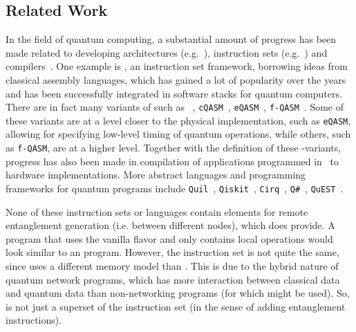 \subsection{Related Work}
\label{sec:related}
In the field of quantum computing, a substantial amount of progress has been made related to developing
architectures (e.g.~\cite{fu2017microarchitecture,bourassa2020photonicblueprint, murali2019fullstack, wecker2014liqui, khammassi2020openql, amy2019staq, green2013quipper, Steiger2016}),
instruction sets (e.g.~\cite{cross2017openqasm,khammassi2018cqasm,fu2019eqasm,liu2017fqasm,smith2016quil,qiskit,cirq,qsharp,jones2019quest}) and
compilers~\cite{zulehner2019compiling, haner2018software, gokhale2020quantum, liu2020new, gokhale2020optimized, ding2020square, smith2020opensource, Sivarajah_2020, hietala2019verified, zhang2020contextmapping, niu2020hardware, dury2020qubo, pozzi2020using, Nishio_2020}.
One example is \qasm, an instruction set framework, borrowing ideas from classical assembly languages, which has gained a lot of popularity over the years and has been successfully integrated in software stacks for quantum computers.
There are in fact many variants of \qasm such as \openqasm~\cite{cross2017openqasm}, \texttt{cQASM}~\cite{khammassi2018cqasm}, \texttt{eQASM}~\cite{fu2019eqasm}, \texttt{f-QASM}~\cite{liu2017fqasm}.
Some of these variants are at a level closer to the physical implementation, such as \texttt{eQASM}, allowing for specifying low-level timing of quantum operations, while others, such as \texttt{f-QASM}, are at a higher level.
Together with the definition of these \qasm-variants, progress has also been made in compilation of applications programmed in \qasm\ to hardware implementations.
More abstract languages and programming frameworks for quantum programs include \texttt{Quil}~\cite{smith2016quil}, \texttt{Qiskit}~\cite{qiskit}, \texttt{Cirq}~\cite{cirq}, \texttt{Q\#}~\cite{qsharp}, \texttt{QuEST}~\cite{jones2019quest}.

None of these instruction sets or languages contain elements for remote entanglement generation (i.e. between different nodes), which \netqasm does provide.
A \netqasm program that uses the vanilla flavor and only contains local operations would look similar to an \openqasm program.
However, the instruction set is not quite the same, since \netqasm uses a different memory model than \openqasm.
This is due to the hybrid nature of quantum network programs, which has more interaction between classical data and quantum data than non-networking programs (for which \openqasm might be used).
So, \netqasm is not just a superset of the \openqasm instruction set (in the sense of adding entanglement instructions).

